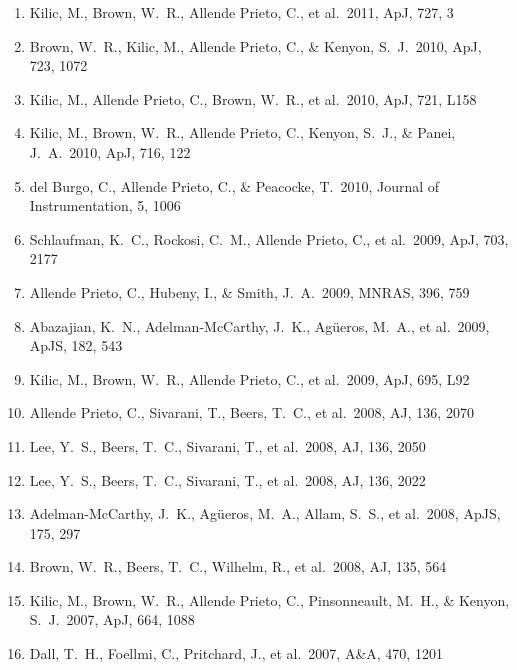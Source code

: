 \documentclass[12pt]{article}
\begin{document}
\begin{enumerate}
\item Kilic, M., Brown, W.~R., 
Allende Prieto, C., et al.\ 2011, ApJ, 727, 3 


\item Brown, W.~R., Kilic, M., 
Allende Prieto, C., \& Kenyon, S.~J.\ 2010, ApJ, 723, 1072 


\item Kilic, M., Allende 
Prieto, C., Brown, W.~R., et al.\ 2010, ApJ, 721, L158 


\item Kilic, M., Brown, W.~R., 
Allende Prieto, C., Kenyon, S.~J., \& Panei, J.~A.\ 2010, ApJ, 716, 122 


\item del Burgo, C., 
Allende Prieto, C., 
\& Peacocke, T.\ 2010, Journal of Instrumentation, 5, 1006 


\item Schlaufman, K.~C., 
Rockosi, C.~M., Allende Prieto, C., et al.\ 2009, ApJ, 703, 2177 


\item Allende Prieto, 
C., Hubeny, I., \& Smith, J.~A.\ 2009, MNRAS, 396, 759 


\item Abazajian, K.~N., 
Adelman-McCarthy, J.~K., Ag{\"u}eros, M.~A., et al.\ 2009, ApJS, 182, 543 


\item Kilic, M., Brown, W.~R., 
Allende Prieto, C., et al.\ 2009, ApJ, 695, L92 


\item Allende Prieto, 
C., Sivarani, T., Beers, T.~C., et al.\ 2008, AJ, 136, 2070 


\item Lee, Y.~S., Beers, T.~C., 
Sivarani, T., et al.\ 2008, AJ, 136, 2050 


\item Lee, Y.~S., Beers, T.~C., 
Sivarani, T., et al.\ 2008, AJ, 136, 2022 


\item 
Adelman-McCarthy, J.~K., Ag{\"u}eros, M.~A., Allam, S.~S., et al.\ 2008, 
ApJS, 175, 297 


\item Brown, W.~R., Beers, 
T.~C., Wilhelm, R., et al.\ 2008, AJ, 135, 564 


\item Kilic, M., Brown, W.~R., 
Allende Prieto, C., Pinsonneault, M.~H., 
\& Kenyon, S.~J.\ 2007, ApJ, 664, 1088 


\item Dall, T.~H., Foellmi, C., Pritchard, J., et al.\ 2007, A\&A, 470, 1201 



\end{enumerate}
\end{document}
